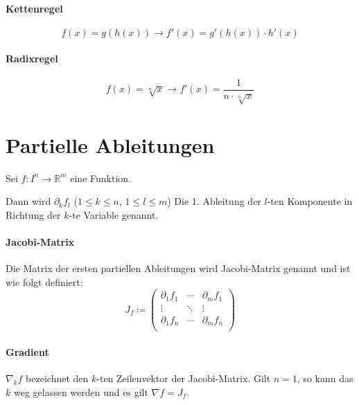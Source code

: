\documentclass[a4paper, 11pt, accentcolor = tud3b]{tudreport}
\begin{document}
                \paragraph{Kettenregel}
                    \[ f(x) = g(h(x)) \rightarrow f'(x) = g'(h(x)) \cdot h'(x) \]

                \paragraph{Radixregel}
                \[ f(x) = \sqrt[n]{x} \rightarrow f'(x) = \frac{1}{n \cdot \sqrt[n]{x}} \]

        \section{Partielle Ableitungen}
            Sei $ f : I ^ n \rightarrow \mathbb{R} ^ m $ eine Funktion.

            Dann wird $ \partial _ k f _ l $ ($ 1 \leq k \leq n $, $ 1 \leq l \leq m $) Die 1. Ableitung der $ l\text{-ten} $ Komponente in Richtung der $ k\text{-te} $ Variable genannt.

            \paragraph{Jacobi-Matrix}
                Die Matrix der ersten partiellen Ableitungen wird Jacobi-Matrix genannt und ist wie folgt definiert:
                \begin{equation*}
                    J _ f \coloneqq
                    \begin{pmatrix}
                        \partial _ 1 f _ 1 & \cdots & \partial _ m f _ 1 \\
                        \vdots & \ddots & \vdots \\
                        \partial _ 1 f _ n & \cdots & \partial _ m f _ n \\
                    \end{pmatrix}
                \end{equation*}

            \paragraph{Gradient}
                $ \nabla _ k f $ bezeichnet den $ k\text{-ten} $ Zeilenvektor der Jacobi-Matrix. Gilt $ n = 1 $, so kann das $ k $ weg gelassen werden und es gilt $ \nabla f = J _ f $.
\end{document}
